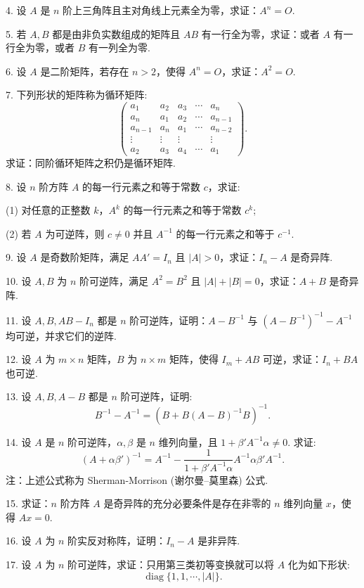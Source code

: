 \documentclass[UTF8, 12pt, fontset=fandol, oneside]{ctexart}
\begin{document}
4. 设 $A$ 是 $n$ 阶上三角阵且主对角线上元素全为零，求证：$A^n=O$.

5. 若 $A,B$ 都是由非负实数组成的矩阵且 $AB$ 有一行全为零，求证：或者 $A$ 有一行全为零，或者 $B$ 有一列全为零.

6. 设 $A$ 是二阶矩阵，若存在 $n>2$，使得 $A^n=O$，求证：$A^2=O$.

7. 下列形状的矩阵称为循环矩阵:
\[
\left(\begin{array}{ccccc}
a_1 & a_2 & a_3 & \cdots & a_n\\
a_n & a_1 & a_2 & \cdots & a_{n-1}\\
a_{n-1} & a_n & a_1 & \cdots & a_{n-2}\\
\vdots & \vdots & \vdots & & \vdots\\
a_2 & a_3 & a_4 & \cdots & a_1
\end{array}\right).
\]
求证：同阶循环矩阵之积仍是循环矩阵.

8. 设 $n$ 阶方阵 $A$ 的每一行元素之和等于常数 $c$，求证:

(1) 对任意的正整数 $k$，$A^k$ 的每一行元素之和等于常数 $c^k$;

(2) 若 $A$ 为可逆阵，则 $c\neq 0$ 并且 $A^{-1}$ 的每一行元素之和等于 $c^{-1}$.

9. 设 $A$ 是奇数阶矩阵，满足 $AA'=I_n$ 且 $|A|>0$，求证：$I_n-A$ 是奇异阵.

10. 设 $A,B$ 为 $n$ 阶可逆阵，满足 $A^2=B^2$ 且 $|A|+|B|=0$，求证：$A+B$ 是奇异阵.

11. 设 $A,B,AB-I_n$ 都是 $n$ 阶可逆阵，证明：$A-B^{-1}$ 与 $(A-B^{-1})^{-1}-A^{-1}$ 均可逆，并求它们的逆阵.

12. 设 $A$ 为 $m\times n$ 矩阵，$B$ 为 $n\times m$ 矩阵，使得 $I_m+AB$ 可逆，求证：$I_n+BA$ 也可逆.

13. 设 $A,B,A-B$ 都是 $n$ 阶可逆阵，证明:
\[
B^{-1}-A^{-1}=\left(B+B(A-B)^{-1}B\right)^{-1}.
\]

14. 设 $A$ 是 $n$ 阶可逆阵，$\alpha,\beta$ 是 $n$ 维列向量，且 $1+\beta'A^{-1}\alpha\neq 0$. 求证:
\[
(A+\alpha\beta')^{-1}=A^{-1}-\frac{1}{1+\beta'A^{-1}\alpha}A^{-1}\alpha\beta'A^{-1}.
\]
注：上述公式称为 Sherman-Morrison (谢尔曼--莫里森) 公式.

15. 求证：$n$ 阶方阵 $A$ 是奇异阵的充分必要条件是存在非零的 $n$ 维列向量 $x$，使得 $Ax=0$.

16. 设 $A$ 为 $n$ 阶实反对称阵，证明：$I_n-A$ 是非异阵.

17. 设 $A$ 为 $n$ 阶可逆阵，求证：只用第三类初等变换就可以将 $A$ 化为如下形状:
\[
\operatorname{diag}\{1,1,\cdots,|A|\}.
\]
\end{document}
